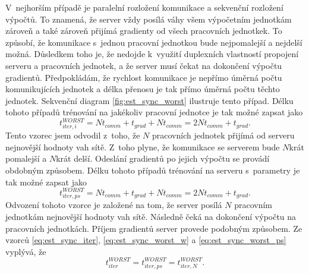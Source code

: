 V~nejhorším případě je paralelní rozložení komunikace a sekvenční rozložení výpočtů.
To znamená, že server vždy posílá váhy všem výpočetním jednotkám zároveň a také zároveň přijímá gradienty od všech pracovních jednotkek.
To způsobí, že komunikace s~jednou pracovní jednotkou bude nejpomalejší a nejdelší možná.
Důsledkem toho je, že nedojde k~využití duplexních vlastností propojení serveru a pracovních jednotek, a že server musí čekat na dokončení výpočtu gradientů.
Předpokládám, že rychlost komunikace je nepřímo úměrná počtu komunikujících jednotek a délka přenosu je tak přímo úměrná počtu těchto jednotek.
Sekvenční diagram \ref{fig:est_sync_worst} ilustruje tento případ.
Délku tohoto případů trénování na jakékoliv pracovní jednotce je tak možné zapsat jako \begin{equation}t_{iter,i}^{WORST}=Nt_{comm}+t_{grad}+Nt_{comm}=2Nt_{comm}+t_{grad}.\label{eq:est_sync_worst_w}\end{equation}
Tento vzorec jsem odvodil z~toho, že $N$ pracovních jednotek přijímá od serveru nejnovější hodnoty vah sítě.
Z~toho plyne, že komunikace se serverem bude $N$krát pomalejší a $N$krát delší.
Odeslání gradientů po jejich výpočtu se provádí obdobným způsobem.
Délku tohoto případů trénování na serveru s~parametry je tak možné zapsat jako \begin{equation}t_{iter,ps}^{WORST}=Nt_{comm}+t_{grad}+Nt_{comm}=2Nt_{comm}+t_{grad}.\label{eq:est_sync_worst_ps}\end{equation}
Odvození tohoto vzorce je založené na tom, že server posílá $N$ pracovním jednotkám nejnovější hodnoty vah sítě.
Následně čeká na dokončení výpočtu na pracovních jednotkách.
Příjem gradientů server provede podobným způsobem.
Ze vzorců \ref{eq:est_sync_iter}, \ref{eq:est_sync_worst_w} a \ref{eq:est_sync_worst_ps} vyplývá, že \begin{equation}t_{iter}^{WORST}=t_{iter,ps}^{WORST}=t_{iter,N}^{WORST}.\label{eq:est_sync_worst_f}\end{equation}

